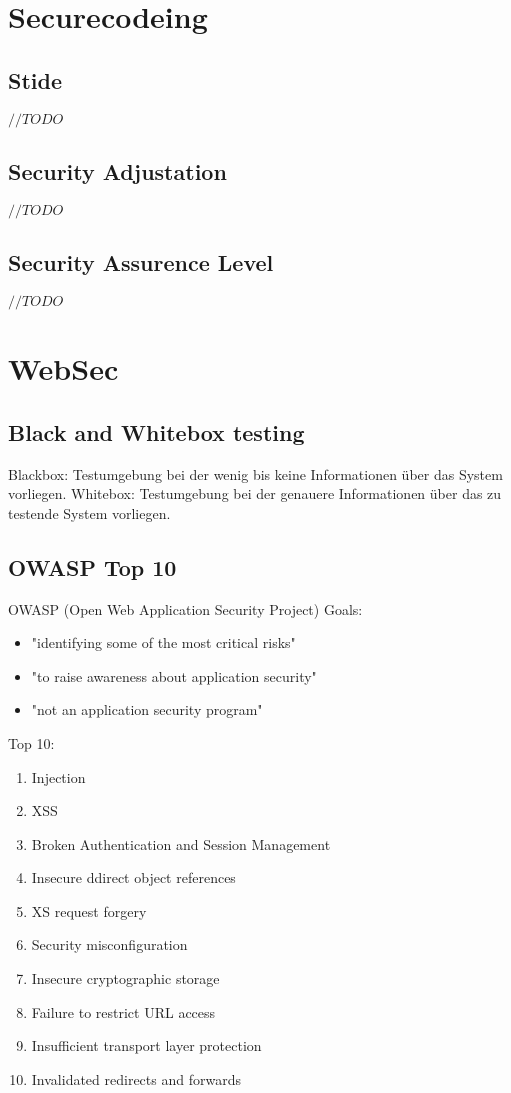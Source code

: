 \documentclass[a4paper, 12pt]{article}
\begin{document}
\section{Securecodeing}
\subsection{Stide}
$ //TODO $
\subsection{Security Adjustation}
$ //TODO $
\subsection{Security Assurence Level}
$ //TODO $

\section{WebSec}
\subsection{Black and Whitebox testing}
	\large Blackbox:
	Testumgebung bei der wenig bis keine Informationen über das System vorliegen.
	\large Whitebox:
	Testumgebung bei der genauere Informationen über das zu testende System vorliegen.
\subsection{OWASP Top 10}
	\large OWASP (Open Web Application Security Project)
	\large Goals:
	\begin{itemize}
		\item "identifying some of the most critical risks"
		\item "to raise awareness about application security"
		\item "not an application security program"
	\end{itemize}
	\large Top 10:
	\begin{enumerate}
		\item Injection
		\item XSS
		\item Broken Authentication and Session Management
		\item Insecure ddirect object references
		\item XS request forgery
		\item Security misconfiguration
		\item Insecure cryptographic storage
		\item Failure to restrict URL access
		\item Insufficient transport layer protection
		\item Invalidated redirects and forwards
	\end{enumerate}
\end{document}
